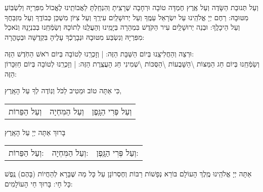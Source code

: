 \documentclass[a4paper, twoside, openany, parskip=half, 10pt]{article}
\begin{document}
\begin{multicols}{3}
וְעַל תְּנוּבַת הַשָּׂדֶה וְעַל אֶֽרֶץ חֶמְדָּה טוֹבָה וּרְחָבָה 
שֶׁרָצִֽיתָ וְהִנְחַֽלְתָּ לַאֲבוֹתֵֽינוּ לֶאֱכוֹל מִפִּרְיָהּ וְלִשְׂבּֽוֹעַ מִטּוּבָהּ: 
רַחֶם יְיָ אֱלֹהֵֽינוּ עַל יִשְׂרָאֵל עַמֶּֽךָ וְעַל יְרוּשָׁלַֽיִם עִירֶֽךָ וְעַל צִיּוֹן מִשְׁכַּן כְּבוֹדֶֽךָ וְעַל מִזְבַּחֲךָ וְעַל הֵיכָלֶֽךָ: וּבְנֵה יְרוּשָׁלַֽיִם עִיר הַקֹּדֶשׁ בִּמְהֵרָה בְּיָמֵֽינוּ וְהַעֲלֵֽנוּ לְתוֹכָהּ וְשַׂמְּֿחֵֽנוּ בְּבִנְיָנָהּ וְנֹאכַל מִפִּרְיָהּ וְנִשְׂבַּע מִטּוּבָהּ וּנְבָרֶכְֿךָ עָלֶיהָ בִּקְדֻשָּׁה וּבְטָהֳרָה:

\begin{small}

וּרְצֵה וְהַחֲלִיצֵֽנוּ בְּיוֹם הַשַּׁבָּת הַזֶּה: | 
וְזָכְרֵֽנוּ לְטוֹבָה בְּיוֹם רֹאשׁ הַחֹֽדֶשׁ הַזֶּה: \\
וְשַׂמְּֿחֵֽנוּ בְּיוֹם 
חַג הַמַּצּוֹת \textbackslash הַשָּׁבֻעוֹת \textbackslash הַסֻּכּוֹת \textbackslash  שְׁמִינִי חַג הָעֲצֶֽרֶת הַזֶּה: | 
וְזָכְרֵֽנוּ לְטוֹבָה בְּיוֹם חַזִּכָּרוֹן הַזֶּה:

\end{small}

כִּי אַתָּה טוֹב וּמֵטִיב לַכֹּל וְנֽוֹדֶה לְךָ עַל הָאָֽרֶץ, 

\begin{tabular}{c|c|c}
וְעַל הַפֵּרוֹת & וְעַל הַמִּחְיָה & וְעַל פְּרִי הַגָּֽפֶן
\end{tabular}

בָּרוּךְ אַתָּה יְיָ עַל הָאָֽרֶץ 

\begin{tabular}{c|c|c}
וְעַל הַפֵּרוֹת: & וְעַל הַמִּחְיָה: & וְעַל פְּרִי הַגָּֽפֶן:\\
\end{tabular}

\vspace{\baselineskip}

  אַתָּה יְיָ אֱלֹהֵֽינוּ מֶֽלֶךְ הָעוֹלָם בּוֹרֵא נְפָשׁוֹת רַבּוֹת וְחֶסְרוֹנָן 
עַל כָּל מַה שֶּׁבָּרָא לְהַחֲיוֹת (בָּהֶם) נֶֽפֶשׁ כָּל חָי: בָּרוּךְ חַי הָעוֹלָמִים:

\end{multicols}

\clearpage






 \nextpage
\end{document}
